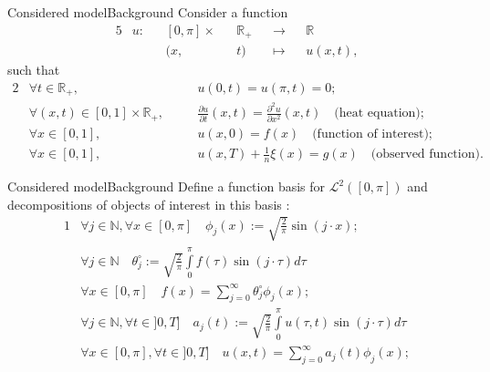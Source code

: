 \documentclass[10pt]{beamer}
\begin{document}
\begin{frame}{Considered model}{Background}
Consider a function
\begin{alignat*}{5}
& u : && [0,\pi] \times &&\mathbb{R}_{+} &&\rightarrow &&\mathbb{R}\\
& &&(x, &&t) && \mapsto && u(x,t),
\end{alignat*}
such that
\begin{alignat*}{2}
& \forall t \in \mathbb{R}_{+}, \quad &&u(0, t) = u(\pi, t) = 0 ;\\
& \forall (x,t) \in [0,1] \times \mathbb{R}_{+}, \quad &&\frac{\partial u}{\partial t}(x, t) = \frac{\partial^{2} u}{\partial x^{2}} (x, t) \quad \text{(heat equation)};\\
& \forall x \in [0,1], \quad &&u(x, 0) = f(x) \quad \text{(function of interest)} ;\\
& \forall x \in [0,1], \quad &&u(x, T) + \frac{1}{n} \xi(x)= g(x) \quad \text{(observed function)}.
\end{alignat*}
\end{frame}

\begin{frame}{Considered model}{Background}
Define a function basis for $\mathcal{L}^{2}\left([0, \pi]\right)$ and decompositions of objects of interest in this basis :
\begin{alignat*}{1}
& \forall j \in \mathbb{N}, \forall x \in [0, \pi] \quad \phi_{j}(x) := \sqrt{\frac{2}{\pi}} \sin(j \cdot x) ;\\
& \forall j \in \mathbb{N} \quad \theta^{\circ}_{j} := \sqrt{\frac{2}{\pi}} \int\limits_{0}^{\pi} f(\tau) \sin(j \cdot \tau) d\tau\\
& \forall x \in [0, \pi] \quad f(x) = \sum\limits_{j = 0}^{\infty} \theta^{\circ}_{j} \phi_{j}(x) ;\\
& \forall j \in \mathbb{N}, \forall t \in ]0, T] \quad a_{j}(t) := \sqrt{\frac{2}{\pi}} \int\limits_{0}^{\pi} u(\tau, t) \sin(j \cdot \tau) d\tau\\
& \forall x \in [0, \pi], \forall t \in ]0, T] \quad u(x, t) = \sum\limits_{j = 0}^{\infty} a_{j}(t) \phi_{j}(x) ;\\
\end{alignat*}
\end{frame}
\end{document}
